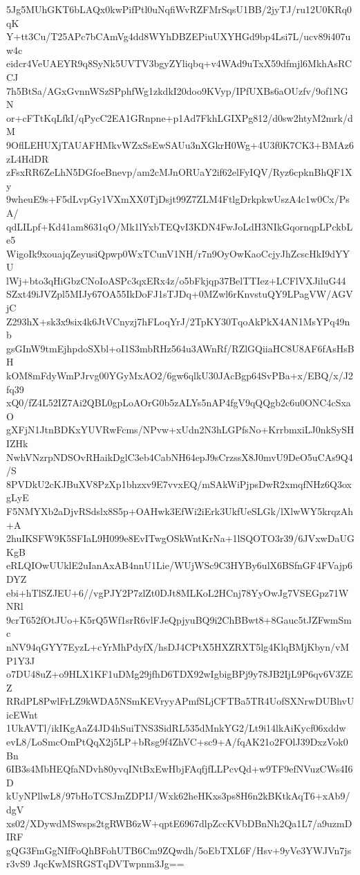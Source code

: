 5Jg5MUhGKT6bLAQx0kwPifPtl0uNqfiWvRZFMrSqsU1BB/2jyTJ/ru12U0KRq0qK
Y+tt3Cu/T25APc7bCAmVg4dd8WYhDBZEPiuUXYHGd9bp4Lsi7L/ucv89i407uw4c
eidcr4VeUAEYR9q8SyNk5UVTV3bgyZYliqbq+v4WAd9uTxX59dfmjl6MkhAsRCCJ
7h5BtSa/AGxGvnnWSzSPphfWg1zkdkI20doo9KVyp/IPfUXBs6aOUzfv/9of1NGN
or+cFTtKqLfkI/qPycC2EA1GRnpne+p1Ad7FkhLGIXPg812/d0sw2htyM2mrk/dM
9OflLEHUXjTAUAFHMkvWZxSsEwSAUu3nXGkrH0Wg+4U3f0K7CK3+BMAz6zL4HdDR
zFsxRR6ZeLhN5DGfoeBnevp/am2cMJnORUaY2if62elFyIQV/Ryz6cpknBhQF1Xy
9wheuE9s+F5dLvpGy1VXmXX0TjDsjt99Z7ZLM4FtlgDrkpkwUszA4c1w0Cx/PsA/
qdLILpf+Kd41am8631qO/Mk1lYxbTEQvI3KDN4FwJoLdH3NIkGqornqpLPckbLe5
WigoIk9xouajqZeyusiQpwp0WxTCunV1NH/r7n9OyOwKaoCcjyJhZcscHkI9dYYU
lWj+bto3qHiGbzCNoIoASPc3qxERx4z/o5bFkjqp37BelTTIez+LCFlVXJiluG44
SZxt49iJVZpl5MIJy67OA55IkDoFJ1sTJDq+0MZwl6rKnvstuQY9LPagVW/AGVjC
Z293hX+sk3x9six4k6JtVCnyzj7hFLoqYrJ/2TpKY30TqoAkPkX4AN1MsYPq49nb
gsGInW9tmEjhpdoSXbl+oI1S3mbRHz564u3AWnRf/RZlGQiiaHC8U8AF6fAsHsBH
kOM8mFdyWmPJrvg00YGyMxAO2/6gw6qlkU30JAcBgp64SvPBa+x/EBQ/x/J2fq39
xQ0/fZ4L52IZ7Ai2QBL0gpLoAOrG0b5zALYs5nAP4fgV9qQQgb2c6u0ONC4cSxaO
gXFjN1JtnBDKxYUVRwFcms/NPvw+xUdn2N3hLGPfsNo+KrrbmxiLJ0nkSySHIZHk
NwhVNzrpNDSOvRHaikDglC3eb4CabNH64epJ9sCrzssX8J0mvU9DeO5uCAs9Q4/S
8PVDkU2cKJBuXV8PzXp1bhzxv9E7vvxEQ/mSAkWiPjpsDwR2xmqfNHz6Q3oxgLyE
F5NMYXb2aDjvRSdslx8S5p+OAHwk3EfWi2iErk3UkfUeSLGk/lXlwWY5krqzAh+A
2huIKSFW9K5SFIaL9H099e8EvITwgOSkWntKrNa+1lSQOTO3r39/6JVxwDaUGKgB
eRLQIOwUUklE2uIanAxAB4nnU1Lie/WUjWSc9C3HYBy6ulX6BSfnGF4FVajp6DYZ
ebi+hTlSZJEU+6//vgPJY2P7zlZt0DJt8MLKoL2HCnj78YyOwJg7VSEGpz71WNRl
9crT652fOtJUo+K5rQ5Wf1srR6vlFJeQpjyuBQ9i2ChBBwt8+8Gauc5tJZFwmSmc
nNV94qGYY7EyzL+cYrMhPdyfX/hsDJ4CPtX5HXZRXT5lg4KlqBMjKbyn/vMP1Y3J
o7DU48uZ+o9HLX1KF1uDMg29jfhD6TDX92wIgbigBPj9y78JB2IjL9P6qv6V3ZEZ
RRdPL8PwlFrLZ9kWDA5NSmKEVryyAPmfSLjCFTBa5TR4UofSXNrwDUBhvUicEWnt
1UkAVTl/ikIKgAaZ4JD4hSuiTNS3SidRL535dMnkYG2/Lt9i14lkAiKycf06xddw
evL8/LoSmcOmPtQqX2j5LP+bRsg9f4ZhVC+sc9+A/fqAK21o2FOlJ39DxzVok0Bn
6IB3s4MbHEQfaNDvh80yvqINtBxEwHbjFAqfjfLLPcvQd+w9TF9efNVuzCWs4I6D
kUyNPllwL8/97bHoTCSJmZDPIJ/Wxk62heHKxs3ps8H6n2kBKtkAqT6+xAb9/dgV
xs02/XDywdMSwsps2tgRWB6zW+qptE6967dlpZccKVbDBnNh2Qa1L7/a9uzmDIRF
gQG3FmGgNIfFoQhBFohUTB6Cm9ZQwdh/5oEbTXL6F/Hsv+9yVe3YWJVn7jsr3vS9
JqcKwMSRGSTqDVTwpnm3Jg==
